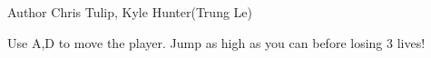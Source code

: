 \begin{DoxyAuthor}{Author}
Chris Tulip, Kyle Hunter(\+Trung Le)
\end{DoxyAuthor}
Use A,D to move the player. Jump as high as you can before losing 3 lives! 